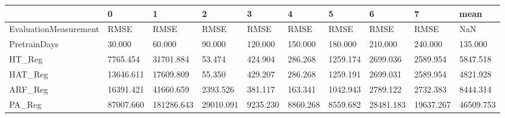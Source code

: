 \begin{tabular}{llllllllll}
\toprule
{} &         0 &          1 &         2 &        3 &        4 &        5 &         6 &         7 &      mean \\
\midrule
EvaluationMeasurement &      RMSE &       RMSE &      RMSE &     RMSE &     RMSE &     RMSE &      RMSE &      RMSE &       NaN \\
PretrainDays          &    30.000 &     60.000 &    90.000 &  120.000 &  150.000 &  180.000 &   210.000 &   240.000 &   135.000 \\
HT\_Reg                &  7765.454 &  31701.884 &    53.474 &  424.904 &  286.268 & 1259.174 &  2699.036 &  2589.954 &  5847.518 \\
HAT\_Reg               & 13646.611 &  17609.809 &    55.350 &  429.207 &  286.268 & 1259.191 &  2699.031 &  2589.954 &  4821.928 \\
ARF\_Reg               & 16391.421 &  41660.659 &  2393.526 &  381.117 &  163.341 & 1042.943 &  2789.122 &  2732.383 &  8444.314 \\
PA\_Reg                & 87007.660 & 181286.643 & 29010.091 & 9235.230 & 8860.268 & 8559.682 & 28481.183 & 19637.267 & 46509.753 \\
\bottomrule
\end{tabular}
